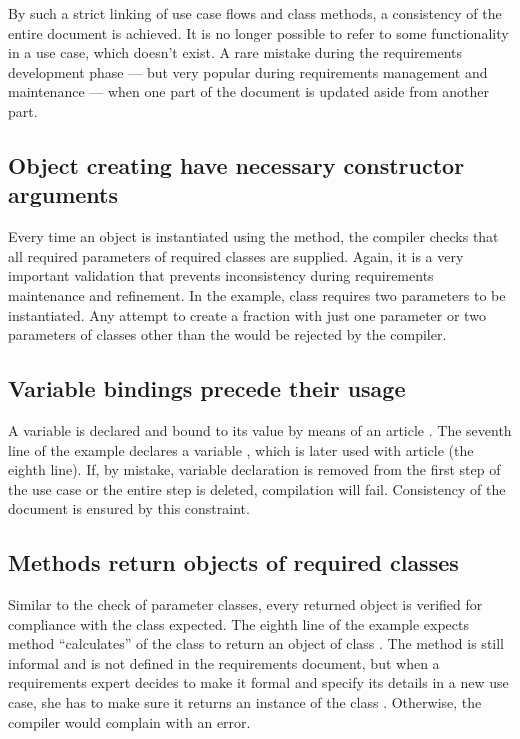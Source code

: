 \documentclass[sigplan,10pt,nonacm=true]{acmart}
\begin{document}
By such a strict linking of use case flows and class methods, a consistency
of the entire document is achieved. It is no longer possible to refer to
some functionality in a use case, which doesn't exist. A rare mistake during
the requirements development phase --- but very popular during requirements
management and maintenance --- when one part of the document is updated aside
from another part.

\subsection{Object creating have necessary constructor arguments}

Every time an object is instantiated using the  method,
the compiler checks that all required parameters of required classes are
supplied. Again, it is a very important validation that prevents inconsistency
during requirements maintenance and refinement. In the example, class
 requires two parameters to be instantiated. Any attempt to
create a fraction with just one parameter or two parameters of classes other
than the  would be rejected by the compiler.

\subsection{Variable bindings precede their usage}

A variable is declared and bound to its value by means of an article
. The seventh line of the example declares a variable
, which is later used with article  (the eighth
line). If, by mistake, variable declaration is removed from the first step
of the use case or the entire step is deleted, compilation will fail.
Consistency of the document is ensured by this constraint.

\subsection{Methods return objects of required classes}

Similar to the check of parameter classes, every returned object is verified
for compliance with the class expected. The eighth line of the example
expects method ``calculates'' of the class  to return an object
of class . The method is still informal and is not defined in
the requirements document, but when a requirements expert decides to make it
formal and specify its details in a new use case, she has to make sure it
returns an instance of the class . Otherwise, the compiler would
complain with an error.
\end{document}
